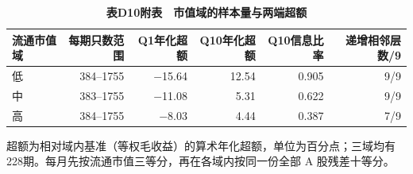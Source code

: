 \begingroup\small\setlength{\tabcolsep}{4pt}
\begin{table}[H]\centering
\caption*{\textbf{表D10附表　市值域的样本量与两端超额}}
\begin{tabular*}{\textwidth}{@{\extracolsep{\fill}}lrrrrr@{}}\toprule
流通市值域 & 每期只数范围 & Q1年化超额 & Q10年化超额 & Q10信息比率 & 递增相邻层数/9 \\ \midrule
低 & 384--1755 & $-$15.64 & 12.54 & 0.905 & 9/9 \\
中 & 383--1755 & $-$11.08 & 5.31 & 0.622 & 9/9 \\
高 & 384--1755 & $-$8.03 & 4.44 & 0.387 & 7/9 \\
\bottomrule\end{tabular*}
\par\smallskip\raggedright\footnotesize 超额为相对域内基准（等权毛收益）的算术年化超额，单位为百分点；三域均有228期。每月先按流通市值三等分，再在各域内按同一份全部 A 股残差十等分。\end{table}
\endgroup
